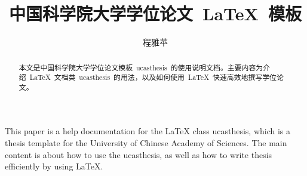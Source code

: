   \confidential{}%
  \title[国科大学位论文~\LaTeX{}~模板]{中国科学院大学学位论文~\LaTeX{}~模板}%
  \author{程雅苹}%
\maketitle
\makeenglishtitle


\begin{abstract}
本文是中国科学院大学学位论文模板~ucasthesis~的使用说明文档。主要内容为介绍~\LaTeX{}~文档类~ucasthesis~的用法，以及如何使用~\LaTeX{}~快速高效地撰写学位论文。

\end{abstract}


\begin{englishabstract}
This paper is a help documentation for the \LaTeX{} class ucasthesis, which is  a thesis template for the University of Chinese Academy of Sciences. The main content is about how to use the ucasthesis, as well as how to write thesis efficiently by using \LaTeX{}.

\end{englishabstract}
